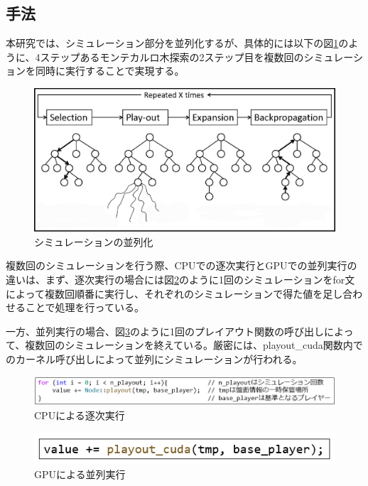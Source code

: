 \documentclass[10pt, a4paper]{jsarticle}
\begin{document}
\subsection{手法}
本研究では、シミュレーション部分を並列化するが、具体的には以下の図\ref{fig:parallel}のように、4ステップあるモンテカルロ木探索の2ステップ目を複数回のシミュレーションを同時に実行することで実現する。
\begin{figure}[ht]
    \begin{center}
        \includegraphics[width=15cm]{img/mcts_parallel.jpg}
        \caption{シミュレーションの並列化\cite{img:parallel}} \label{fig:parallel}
    \end{center}
\end{figure}
\par 複数回のシミュレーションを行う際、CPUでの逐次実行とGPUでの並列実行の違いは、まず、逐次実行の場合には図\ref{fig:cpu_mcts_code}のように1回のシミュレーションをfor文によって複数回順番に実行し、それぞれのシミュレーションで得た値を足し合わせることで処理を行っている。
\par 一方、並列実行の場合、図\ref{fig:gpu_mcts_code}のように1回のプレイアウト関数の呼び出しによって、複数回のシミュレーションを終えている。厳密には、playout\_cuda関数内でのカーネル呼び出しによって並列にシミュレーションが行われる。
\begin{figure}[ht]
    \begin{center}
        \includegraphics[width=15cm]{img/cpu_mcts_code.png}
        \caption{CPUによる逐次実行}
        \label{fig:cpu_mcts_code}
    \end{center}
\end{figure}
\begin{figure}[ht]
    \begin{center}
        \includegraphics[width=12cm]{img/gpu_mcts_code.png}
        \caption{GPUによる並列実行}
        \label{fig:gpu_mcts_code}
    \end{center}
\end{figure}
\end{document}
